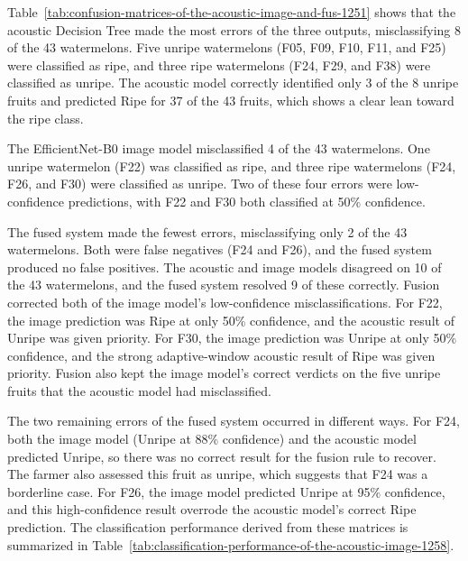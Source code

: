 \begin{thesisprose}
Table~\ref{tab:confusion-matrices-of-the-acoustic-image-and-fus-1251} shows that the acoustic Decision Tree made the most errors of the three outputs, misclassifying 8 of the 43 watermelons. Five unripe watermelons (F05, F09, F10, F11, and F25) were classified as ripe, and three ripe watermelons (F24, F29, and F38) were classified as unripe. The acoustic model correctly identified only 3 of the 8 unripe fruits and predicted Ripe for 37 of the 43 fruits, which shows a clear lean toward the ripe class.

The EfficientNet-B0 image model misclassified 4 of the 43 watermelons. One unripe watermelon (F22) was classified as ripe, and three ripe watermelons (F24, F26, and F30) were classified as unripe. Two of these four errors were low-confidence predictions, with F22 and F30 both classified at 50\% confidence.

The fused system made the fewest errors, misclassifying only 2 of the 43 watermelons. Both were false negatives (F24 and F26), and the fused system produced no false positives. The acoustic and image models disagreed on 10 of the 43 watermelons, and the fused system resolved 9 of these correctly. Fusion corrected both of the image model's low-confidence misclassifications. For F22, the image prediction was Ripe at only 50\% confidence, and the acoustic result of Unripe was given priority. For F30, the image prediction was Unripe at only 50\% confidence, and the strong adaptive-window acoustic result of Ripe was given priority. Fusion also kept the image model's correct verdicts on the five unripe fruits that the acoustic model had misclassified.

The two remaining errors of the fused system occurred in different ways. For F24, both the image model (Unripe at 88\% confidence) and the acoustic model predicted Unripe, so there was no correct result for the fusion rule to recover. The farmer also assessed this fruit as unripe, which suggests that F24 was a borderline case. For F26, the image model predicted Unripe at 95\% confidence, and this high-confidence result overrode the acoustic model's correct Ripe prediction. The classification performance derived from these matrices is summarized in Table~\ref{tab:classification-performance-of-the-acoustic-image-1258}.


\end{thesisprose}
